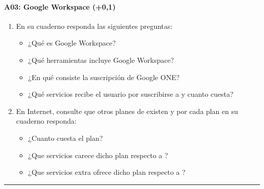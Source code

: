 \documentclass[letterpaper,10pt,spanish]{sphinxmanual}
\begin{document}
\paragraph{A03: Google Workspace (+0,1)}
\label{\detokenize{cursos/ofimatica10/periodo01/G01:a03-google-workspace-0-1}}
\sphinxAtStartPar
{}
\begin{enumerate}
%
\item {} 
\sphinxAtStartPar
En su cuaderno responda las siguientes preguntas:
\begin{itemize}
\item {} 
\sphinxAtStartPar
¿Qué es Google Workspace?

\item {} 
\sphinxAtStartPar
¿Qué herramientas incluye Google Workspace?

\item {} 
\sphinxAtStartPar
¿En qué consiste la suscripción de Google ONE?

\item {} 
\sphinxAtStartPar
¿Qué servicios recibe el usuario por suscribirse a  y cuanto cuesta?

\end{itemize}

\item {} 
\sphinxAtStartPar
En Internet, consulte que otros planes de  existen y por cada plan en su cuaderno responda:
\begin{itemize}
\item {} 
\sphinxAtStartPar
¿Cuanto cuesta el plan?

\item {} 
\sphinxAtStartPar
¿Que servicios carece dicho plan respecto a ?

\item {} 
\sphinxAtStartPar
¿Que servicios extra ofrece dicho plan respecto a ?

\end{itemize}

\end{enumerate}


\bigskip\hrule\bigskip
\end{document}
